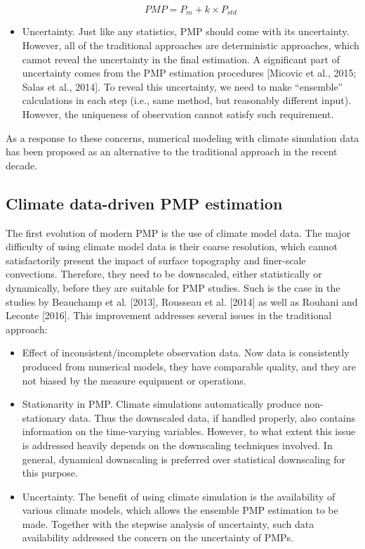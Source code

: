 \begin{itemize}
\begin{equation}
	PMP = P_{m} + k \times P_{std}
	\label{eq:1-2}
\end{equation}

\item Uncertainty. Just like any statistics, PMP should come with its uncertainty. However, all of the traditional approaches are deterministic approaches, which cannot reveal the uncertainty in the final estimation. A significant part of uncertainty comes from the PMP estimation procedures [Micovic et al., 2015; Salas et al., 2014]. To reveal this uncertainty, we need to make ``ensemble'' calculations in each step (i.e., same method, but reasonably different input). However, the uniqueness of observation cannot satisfy such requirement.
\end{itemize}

As a response to these concerns, numerical modeling with climate simulation data has been proposed as an alternative to the traditional approach in the recent decade.

\subsection{Climate data-driven PMP estimation}

The first evolution of modern PMP is the use of climate model data. The major difficulty of using climate model data is their coarse resolution, which cannot satisfactorily present the impact of surface topography and finer-scale convections. Therefore, they need to be downscaled, either statistically or dynamically, before they are suitable for PMP studies. Such is the case in the studies by Beauchamp et al. [2013], Rousseau et al. [2014] as well as Rouhani and Leconte [2016]. This improvement addresses several issues in the traditional approach:

\begin{itemize}
\item Effect of inconsistent/incomplete observation data. Now data is consistently produced from numerical models, they have comparable quality, and they are not biased by the measure equipment or operations.

\item Stationarity in PMP. Climate simulations automatically produce non-stationary data. Thus the downscaled data, if handled properly, also contains information on the time-varying variables. However, to what extent this issue is addressed heavily depends on the downscaling techniques involved. In general, dynamical downscaling is preferred over statistical downscaling for this purpose.

\item Uncertainty. The benefit of using climate simulation is the availability of various climate models, which allows the ensemble PMP estimation to be made. Together with the stepwise analysis of uncertainty, such data availability addressed the concern on the uncertainty of PMPs.
\end{itemize}

